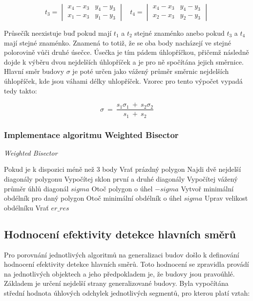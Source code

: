 \documentclass{article}
\begin{document}
\begin{spacing}{1.5}
$$t_3 = \begin{vmatrix} x_4 - x_3 & y_4 - y_3 \\ x_1 - x_3 & y_1 - y_3  \end{vmatrix} \ \ \ \
t_4 = \begin{vmatrix} x_4 - x_3 & y_4 - y_3 \\ x_2 - x_3 & y_2 - y_3 \end{vmatrix}$$

Průsečík neexistuje buď pokud mají $t_1$ a $t_2$ stejné znaménko anebo pokud $t_3$ a $t_4$ mají stejné znaménko. Znamená to totiž, že se oba body nacházejí ve stejné polorovině vůči druhé úsečce. Úsečka je tím pádem úhlopříčkou, přičemž následně dojde k výběru dvou nejdelších úhlopříček a je pro ně spočítána jejich směrnice. Hlavní směr budovy $\sigma$ je poté určen jako vážený průměr směrnic nejdelších úhlopříček, kde jsou váhami délky uhlopříček. Vzorec pro tento výpočet vypadá tedy takto:  

$$\sigma\ =\ \frac{s_1\sigma_1\ +\ s_2\sigma_2}{s_1\ +\ s_2}$$

\subsubsection*{Implementace algoritmu Weighted Bisector}

\begin{algorithm}[h]
    \caption {\textit{Weighted Bisector}}
    \begin{algorithmic}[1]
        \State Pokud je k dispozici méně než 3 body
        \State \indent Vrať prázdný polygon
        \State Najdi dvě nejdelší diagonály polygonu
        \State Vypočítej sklon první a druhé diagonály
        \State Vypočítej vážený průměr úhlů diagonál $sigma$ 
        \State Otoč polygon o úhel $-sigma$
        \State Vytvoř minimální obdélník pro daný polygon
        \State Otoč minimální obdélník o úhel $sigma$
        \State Uprav velikost obdélníku 
        \State Vrať $er\_res$
    \end{algorithmic}
\end{algorithm}

\newpage
\subsection{Hodnocení efektivity detekce hlavních směrů}
Pro porovnání jednotlivých algoritmů na generalizaci budov došlo k definování hodnocení efektivity detekce hlavních směrů. Toto hodnocení se zpravidla provádí na jednotlivých objektech a jeho předpokladem je, že budovy jsou pravoúhlé. Základem je určení nejdelší strany generalizované budovy. Byla vypočítána střední hodnota úhlových odchylek jednotlivých segmentů, pro kterou platí vztah: 


\end{spacing}
\end{document}
